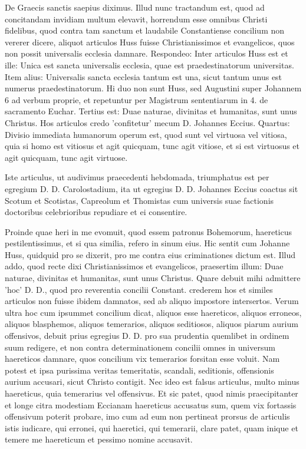 De Graecis sanctis saepius diximus. Illud nunc tractandum est, quod ad concitandam invidiam multum elevavit, horrendum esse omnibus Christi fidelibus, quod contra tam sanctum et laudabile Constantiense concilium non vererer dicere, aliquot articulos Huss fuisse Christianissimos et evangelicos, quos non possit universalis ecclesia damnare. Respondeo: Inter articulos Huss est et ille: Unica est sancta universalis ecclesia, quae est praedestinatorum universitas. Item alius: Universalis sancta ecclesia tantum est una, sicut tantum unus est numerus praedestinatorum. Hi duo non sunt Huss, sed Augustini super Johannem 6 ad verbum proprie, et repetuntur per Magistrum sententiarum in 4. de sacramento Euchar. Tertius est: Duae naturae, divinitas et humanitas, sunt unus Christus. Hos articulos credo 'confitetur' mecum D. \marginpar{\small[288]} Johannes Eccius. Quartus: Divisio immediata humanorum operum est, quod sunt vel virtuosa vel vitiosa, quia si homo est vitiosus et agit quicquam, tunc agit vitiose, et si est virtuosus et agit quicquam, tunc agit virtuose.

Iste articulus, ut audivimus praecedenti hebdomada, triumphatus est per egregium D. D. Carolostadium, ita ut egregius D. D. Johannes Eccius coactus sit Scotum et Scotistas, Capreolum et Thomistas cum universis suae factionis doctoribus celebrioribus repudiare et ei consentire.

Proinde quae heri in me evomuit, quod essem patronus Bohemorum, haereticus pestilentissimus, et si qua similia, refero in sinum eius. Hic sentit cum Johanne Huss, quidquid pro se dixerit, pro me contra eius criminationes dictum est. Illud addo, quod recte dixi Christianissimos et evangelicos, praesertim illum: Duae naturae, divinitas et humanitas, sunt unus Christus. Quare debuit mihi admittere 'hoc' D. D., quod pro reverentia concilii Constant. crederem hos et similes articulos non fuisse ibidem damnatos, sed ab aliquo impostore intersertos. Verum ultra hoc cum ipsummet concilium dicat, aliquos esse haereticos, aliquos erroneos, aliquos blasphemos, aliquos temerarios, aliquos seditiosos, aliquos piarum aurium offensivos, debuit prius egregius D. D. pro sua prudentia quemlibet in ordinem suum redigere, et non contra determinationem concilii omnes in universum haereticos damnare, quos concilium vix temerarios forsitan esse voluit. Nam potest et ipsa purissima veritas temeritatis, scandali, seditionis, offensionis aurium accusari, sicut Christo contigit. Nec ideo est falsus articulus, multo minus haereticus, quia temerarius vel offensivus. Et sic patet, quod nimis praecipitanter et longe citra modestiam Eccianam haereticus accusatus sum, quem vix fortassis offensivum poterit probare, imo cum ad eum non pertineat prorsus de articulis istis iudicare, qui erronei, qui haeretici, qui temerarii, clare patet, quam inique et temere me haereticum et pessimo nomine accusavit.

